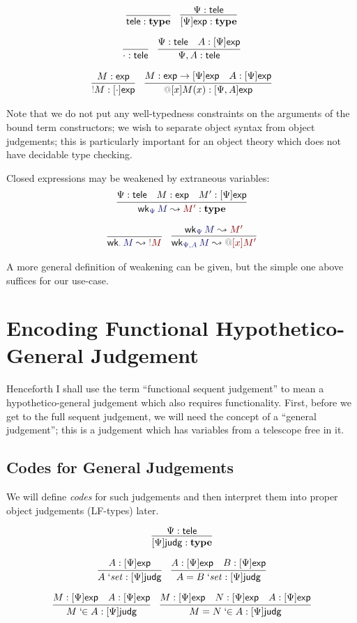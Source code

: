 \documentclass[acmtoplas]{acmtrans2m}
\makeatletter
\def\InputModeColorName{MidnightBlue}
\def\OutputModeColorName{Maroon}
\newcommand\InputMode[1]{{\color{\InputModeColorName}{#1}}}
\newcommand\OutputMode[1]{{\color{\OutputModeColorName}{#1}}}
\newcommand\type{\mathbf{type}}
\newcommand\sortexp{\mathsf{exp}}
\newcommand\sorttele{\mathsf{tele}}
\newcommand\sortoexp[1]{[#1]\sortexp}
\newcommand\sortj{\mathsf{judg}}
\newcommand\sortoj[1]{[#1]\sortj}
\newcommand\nobind[1]{{\color{Gray}!}#1}
\newcommand\bind[2]{{\color{Gray}@}[#1]#2}
\newcommand\weaken[3]{\mathsf{wk}_{\InputMode{#1}}\,\InputMode{#2}\leadsto\OutputMode{#3}}
\newcommand\qisset[1]{#1\;`\mathit{set}}
\newcommand\qeqset[2]{#1=#2\;`\mathit{set}}
\newcommand\qmem[2]{#1\;`\!\!\in#2}
\newcommand\qeqmem[3]{#1=#2\;`\!\!\in#3}
\makeatother
\begin{document}
\begin{gather*}
  \infer{\sorttele:\type}{}
  \quad
  \infer{
    \sortoexp{\Psi}:\type
  }{
    \Psi:\sorttele
  }\\[6pt]
  \infer{\cdot:\sorttele}{}
  \quad
  \infer{
    \Psi,A:\sorttele
  }{
    \Psi:\sorttele &
    A:\sortoexp{\Psi}
  }\\[6pt]
  \infer{
    \nobind{M}:\sortoexp{\cdot}
  }{
    M:\sortexp
  }
  \quad
  \infer{
    \bind{x}{M(x)}:\sortoexp{\Psi,A}
  }{
    M:\sortexp\to\sortoexp\Psi &
    A:\sortoexp\Psi
  }
\end{gather*}

Note that we do not put any well-typedness constraints on the arguments of the
bound term constructors; we wish to separate object syntax from object
judgements; this is particularly important for an object theory which does not
have decidable type checking.

Closed expressions may be weakened by extraneous variables:
\begin{gather*}
  \infer{
    \weaken{\Psi}{M}{M'}:\type
  }{
    \Psi:\sorttele &
    M:\sortexp &
    M':\sortoexp\Psi
  }\\[6pt]
  \infer{
    \weaken{\cdot}{M}{\nobind{M}}
  }{
  }\quad
  \infer{
    \weaken{\Psi,A}{M}{\bind{x}{M'}}
  }{
    \weaken{\Psi}{M}{M'}
  }
\end{gather*}

A more general definition of weakening can be given, but the simple one above
suffices for our use-case.

\section{Encoding Functional Hypothetico-General Judgement}
Henceforth I shall use the term ``functional sequent judgement'' to mean a
hypothetico-general judgement which also requires functionality. First, before
we get to the full sequent judgement, we will need the concept of a
``general judgement''; this is a judgement which has variables from
a telescope free in it.

\subsection{Codes for General Judgements}
We will define \emph{codes} for such judgements and then
interpret them into proper object judgements (LF-types) later.

\begin{gather*}
  \infer{
    \sortoj\Psi:\type
  }{
    \Psi:\sorttele
  }\\[6pt]
  \infer{
    \qisset{A}:\sortoj\Psi
  }{
    A:\sortoexp\Psi
  }
  \quad
  \infer{
    \qeqset{A}{B}:\sortoj\Psi
  }{
    A:\sortoexp\Psi &
    B:\sortoexp\Psi
  }\\[6pt]
  \infer{
    \qmem{M}{A}:\sortoj\Psi
  }{
    M:\sortoexp\Psi &
    A:\sortoexp\Psi
  }
  \quad
  \infer{
    \qeqmem{M}{N}{A}:\sortoj\Psi
  }{
    M:\sortoexp\Psi &
    N:\sortoexp\Psi &
    A:\sortoexp\Psi
  }
\end{gather*}
\end{document}
